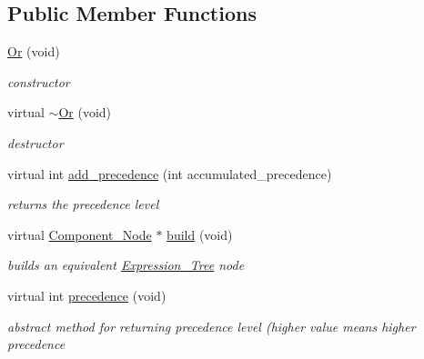 \subsection*{Public Member Functions}
\begin{DoxyCompactItemize}
\item 
\hyperlink{classMadara_1_1Expression__Tree_1_1Or_a602e0157f0cff7514dc490cdbbe6c449}{Or} (void)
\begin{DoxyCompactList}\small\item\em constructor \item\end{DoxyCompactList}\item 
virtual \hyperlink{classMadara_1_1Expression__Tree_1_1Or_a542036ad0217d628aeae811593015353}{$\sim$Or} (void)
\begin{DoxyCompactList}\small\item\em destructor \item\end{DoxyCompactList}\item 
virtual int \hyperlink{classMadara_1_1Expression__Tree_1_1Or_aa1d7a427fbd02c6b02d4117ee5f203c9}{add\_\-precedence} (int accumulated\_\-precedence)
\begin{DoxyCompactList}\small\item\em returns the precedence level \item\end{DoxyCompactList}\item 
virtual \hyperlink{classMadara_1_1Expression__Tree_1_1Component__Node}{Component\_\-Node} $\ast$ \hyperlink{classMadara_1_1Expression__Tree_1_1Or_a9c4b8dbe3e19d4c06874d4bd36d1639b}{build} (void)
\begin{DoxyCompactList}\small\item\em builds an equivalent \hyperlink{classMadara_1_1Expression__Tree_1_1Expression__Tree}{Expression\_\-Tree} node \item\end{DoxyCompactList}\item 
virtual int \hyperlink{classMadara_1_1Expression__Tree_1_1Symbol_ac060dedb8d16864591b259df375109b3}{precedence} (void)
\begin{DoxyCompactList}\small\item\em abstract method for returning precedence level (higher value means higher precedence \item\end{DoxyCompactList}\end{DoxyCompactItemize}

